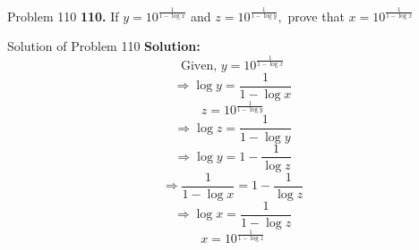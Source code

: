 \documentclass[aspectratio=169,8pt]{beamer}
\begin{document}
\begin{frame}{Problem 110}
  \textbf{110.} If $y = 10^{\frac{1}{1 - \log x}}$ and $z = 10^{\frac{1}{1 - \log y}},$ prove that $x = 10^{\frac{1}{1 - \log x}}$
\end{frame}
\begin{frame}{Solution of Problem 110}
  \textbf{Solution:} $$\text{Given,~}y = 10^{\frac{1}{1 - \log x}}$$
  $$\Rightarrow \log y = \frac{1}{1 - \log x}$$
  $$z = 10^{\frac{1}{1 - \log y}}$$
  $$\Rightarrow \log z = \frac{1}{1 - \log y}$$
  $$\Rightarrow \log y = 1 - \frac{1}{\log z}$$
  $$\Rightarrow \frac{1}{1 - \log x} = 1 - \frac{1}{\log z}$$
  $$\Rightarrow \log x = \frac{1}{1 - \log z}$$
  $$x = 10^{\frac{1}{1 - \log z}}$$
\end{frame}
\end{document}
